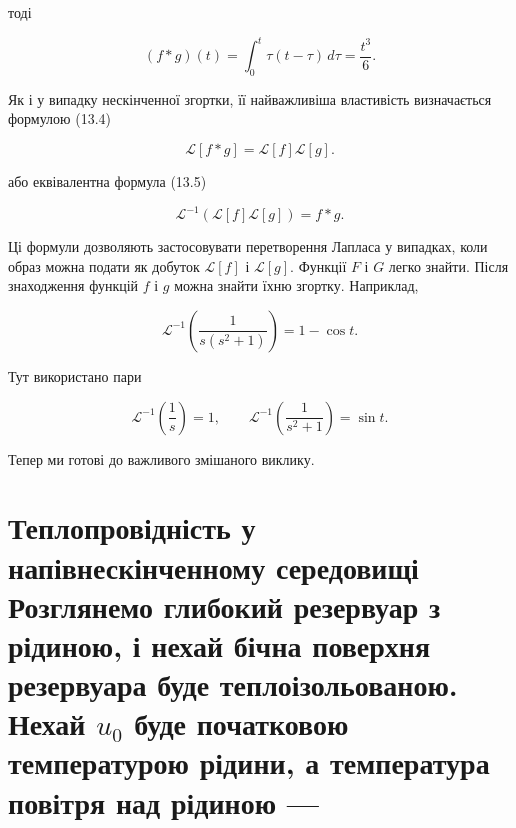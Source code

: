 \documentclass[
  ukrainian,
]{article}
\begin{document}
тоді

\[
(f * g)(t)=\int_0^t \tau(t-\tau)\,d\tau=\frac{t^3}{6}.
\]

Як і у випадку нескінченної згортки, її найважливіша властивість
визначається формулою (13.4)

\[
\mathcal{L}[f*g]=\mathcal{L}[f]\mathcal{L}[g].
\]

або еквівалентна формула (13.5)

\[
\mathcal{L}^{-1}\!\left(\mathcal{L}[f]\mathcal{L}[g]\right)=f*g.
\]

Ці формули дозволяють застосовувати перетворення Лапласа у випадках,
коли образ можна подати як добуток \(\mathcal{L}[f]\) і
\(\mathcal{L}[g]\). Функції \(F\) і \(G\) легко знайти. Після
знаходження функцій \(f\) і \(g\) можна знайти їхню згортку. Наприклад,

\[
\mathcal{L}^{-1}\!\left(\frac{1}{s(s^2+1)}\right)=1-\cos t.
\]

Тут використано пари

\[
\mathcal{L}^{-1}\!\left(\frac{1}{s}\right)=1,\qquad
\mathcal{L}^{-1}\!\left(\frac{1}{s^2+1}\right)=\sin t.
\]

Тепер ми готові до важливого змішаного виклику.

\section{\texorpdfstring{Теплопровідність у напівнескінченному
середовищі Розглянемо глибокий резервуар з рідиною, і нехай бічна
поверхня резервуара буде теплоізольованою. Нехай \(u_0\) буде початковою
температурою рідини, а температура повітря над рідиною
---}{Теплопровідність у напівнескінченному середовищі Розглянемо глибокий резервуар з рідиною, і нехай бічна поверхня резервуара буде теплоізольованою. Нехай u\_0 буде початковою температурою рідини, а температура повітря над рідиною ---}}\label{ux442ux435ux43fux43bux43eux43fux440ux43eux432ux456ux434ux43dux456ux441ux442ux44c-ux443-ux43dux430ux43fux456ux432ux43dux435ux441ux43aux456ux43dux447ux435ux43dux43dux43eux43cux443-ux441ux435ux440ux435ux434ux43eux432ux438ux449ux456-ux440ux43eux437ux433ux43bux44fux43dux435ux43cux43e-ux433ux43bux438ux431ux43eux43aux438ux439-ux440ux435ux437ux435ux440ux432ux443ux430ux440-ux437-ux440ux456ux434ux438ux43dux43eux44e-ux456-ux43dux435ux445ux430ux439-ux431ux456ux447ux43dux430-ux43fux43eux432ux435ux440ux445ux43dux44f-ux440ux435ux437ux435ux440ux432ux443ux430ux440ux430-ux431ux443ux434ux435-ux442ux435ux43fux43bux43eux456ux437ux43eux43bux44cux43eux432ux430ux43dux43eux44e.-ux43dux435ux445ux430ux439-u_0-ux431ux443ux434ux435-ux43fux43eux447ux430ux442ux43aux43eux432ux43eux44e-ux442ux435ux43cux43fux435ux440ux430ux442ux443ux440ux43eux44e-ux440ux456ux434ux438ux43dux438-ux430-ux442ux435ux43cux43fux435ux440ux430ux442ux443ux440ux430-ux43fux43eux432ux456ux442ux440ux44f-ux43dux430ux434-ux440ux456ux434ux438ux43dux43eux44e}
\end{document}
